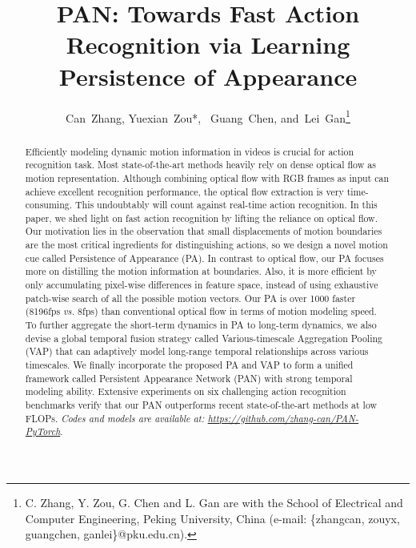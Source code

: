 \documentclass[journal]{IEEEtran}
\begin{document}
\title{PAN: Towards Fast Action Recognition via Learning Persistence of Appearance}


\author{Can~Zhang,
        Yuexian~Zou*,~
        Guang~Chen,
        and~Lei~Gan\thanks{C. Zhang, Y. Zou, G. Chen and L. Gan are with the School of Electrical and Computer Engineering, Peking University, China (e-mail: \{zhangcan, zouyx, guangchen, ganlei\}@pku.edu.cn).}}



















\maketitle

\begin{abstract}







Efficiently modeling dynamic motion information in videos is crucial for action recognition task. Most state-of-the-art methods heavily rely on dense optical flow as motion representation. Although combining optical flow with RGB frames as input can achieve excellent recognition performance, the optical flow extraction is very time-consuming. This undoubtably will count against real-time action recognition. In this paper, we shed light on fast action recognition by lifting the reliance on optical flow. Our motivation lies in the observation that small displacements of motion boundaries are the most critical ingredients for distinguishing actions, so we design a novel motion cue called Persistence of Appearance (PA). In contrast to optical flow, our PA focuses more on distilling the motion information at boundaries. Also, it is more efficient by only accumulating pixel-wise differences in feature space, instead of using exhaustive patch-wise search of all the possible motion vectors. Our PA is over 1000 faster (8196fps \emph{vs.} 8fps) than conventional optical flow in terms of motion modeling speed. To further aggregate the short-term dynamics in PA to long-term dynamics, we also devise a global temporal fusion strategy called Various-timescale Aggregation Pooling (VAP) that can adaptively model long-range temporal relationships across various timescales. We finally incorporate the proposed PA and VAP to form a unified framework called Persistent Appearance Network (PAN) with strong temporal modeling ability. Extensive experiments on six challenging action recognition benchmarks verify that our PAN outperforms recent state-of-the-art methods at low FLOPs. \emph{Codes and models are available at: \textcolor[rgb]{0,0.7,0.2}{\url{https://github.com/zhang-can/PAN-PyTorch}}}.









\end{abstract}
\end{document}
